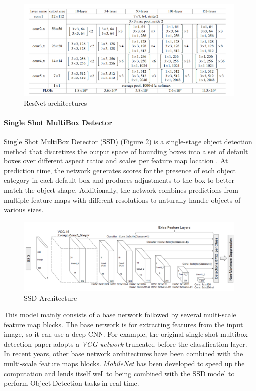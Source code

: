 \begin{figure}
\centerline{\includegraphics[scale=0.4]{images/chapter_2/resnet.png}}
\caption{ResNet architectures \citep{he2016deep}}
\label{fig:resnet_architectures}
\end{figure}


\paragraph{Single Shot MultiBox Detector} \label{Single Shot MultiBox Detector}

Single Shot MultiBox Detector (SSD) (Figure \ref{fig:ssd_architecture}) is a single-stage object detection method that discretizes the output space of bounding boxes into a set of default boxes over different aspect ratios and scales per feature map location \citep{liu2016ssd}. At prediction time, the network generates scores for the presence of each object category in each default box and produces adjustments to the box to better match the object shape. Additionally, the network combines predictions from multiple feature maps with different resolutions to naturally handle objects of various sizes.

\begin{figure}
\centerline{\includegraphics[scale=0.45]{images/chapter_2/ssd_network.png}}
\caption{SSD Architecture \citep{liu2016ssd}}
\label{fig:ssd_architecture}
\end{figure}

This model mainly consists of a base network followed by several multi-scale feature map blocks. The base network is for extracting features from the input image, so it can use a deep CNN. For example, the original single-shot multibox detection paper adopts a \textit{VGG network} \citep{simonyan2014very} truncated before the classification layer. In recent years, other base network architectures have been combined with the multi-scale feature maps blocks. \textit{MobileNet} has been developed to speed up the computation and lends itself well to being combined with the SSD model to perform Object Detection tasks in real-time.  

